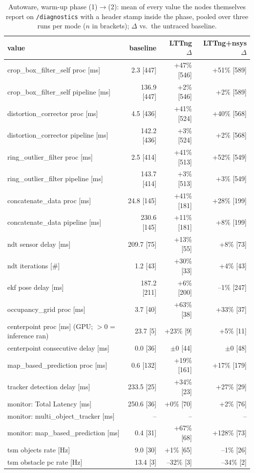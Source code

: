 \begin{table}[t]\centering\scriptsize
\caption{Autoware, warm-up phase (1)$\rightarrow$(2): mean of every value the nodes themselves report on \texttt{/diagnostics} with a header stamp inside the phase, pooled over three runs per mode ($n$ in brackets); $\Delta$ vs.\ the untraced baseline.}
\label{tab:aw-phase-warmup}
\begin{tabular}{lrrr}
\toprule
value & baseline & LTTng $\Delta$ & LTTng+nsys $\Delta$ \\
\midrule
crop\_box\_filter\_self proc [ms] & 2.3 [447] & +47\% [546] & +51\% [589] \\
crop\_box\_filter\_self pipeline [ms] & 136.9 [447] & +2\% [546] & +2\% [589] \\
distortion\_corrector proc [ms] & 4.5 [436] & +41\% [524] & +40\% [568] \\
distortion\_corrector pipeline [ms] & 142.2 [436] & +3\% [524] & +2\% [568] \\
ring\_outlier\_filter proc [ms] & 2.5 [414] & +41\% [513] & +52\% [549] \\
ring\_outlier\_filter pipeline [ms] & 143.7 [414] & +3\% [513] & +3\% [549] \\
concatenate\_data proc [ms] & 24.8 [145] & +41\% [181] & +28\% [199] \\
concatenate\_data pipeline [ms] & 230.6 [145] & +11\% [181] & +8\% [199] \\
ndt sensor delay [ms] & 209.7 [75] & +13\% [55] & +8\% [73] \\
ndt iterations [\#] & 1.2 [43] & +30\% [33] & +4\% [43] \\
ekf pose delay [ms] & 187.2 [211] & +6\% [200] & --1\% [247] \\
occupancy\_grid proc [ms] & 3.7 [40] & +63\% [38] & +33\% [37] \\
centerpoint proc [ms] (GPU; $>$0 = inference ran) & 23.7 [5] & +23\% [9] & +5\% [11] \\
centerpoint consecutive delay [ms] & 0.0 [36] & $\pm$0 [44] & $\pm$0 [48] \\
map\_based\_prediction proc [ms] & 0.6 [132] & +19\% [161] & +17\% [179] \\
tracker detection delay [ms] & 233.5 [25] & +34\% [23] & +27\% [29] \\
monitor: Total Latency [ms] & 250.6 [36] & +0\% [70] & +2\% [76] \\
monitor: multi\_object\_tracker [ms] & -- & -- & -- \\
monitor: map\_based\_prediction [ms] & 0.4 [31] & +67\% [68] & +128\% [73] \\
tsm objects rate [Hz] & 9.0 [30] & +1\% [65] & --1\% [26] \\
tsm obstacle pc rate [Hz] & 13.4 [3] & --32\% [3] & --34\% [2] \\
\bottomrule
\end{tabular}
\end{table}
